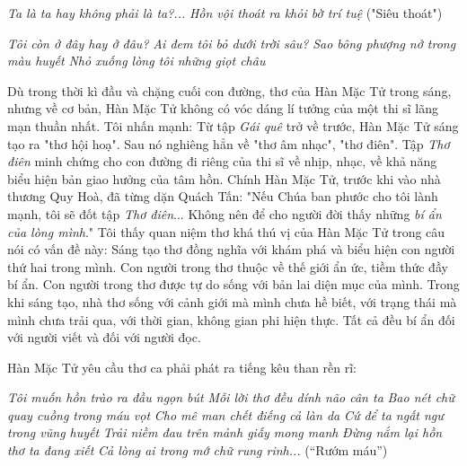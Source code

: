 \documentclass[../main.tex]{subfiles}
\begin{document}
\begin{multicols}{2}
\textit{Ta là ta hay không phải là ta?...} 
\textit{Hồn vội thoát ra khỏi bờ trí tuệ} 
("Siêu thoát") 
				 
\textit{Tôi còn ở đây hay ở đâu?} 
\textit{Ai đem tôi bỏ dưới trời sâu?} 
\textit{Sao bông phượng nở trong màu huyết} 
\textit{Nhỏ xuống lòng tôi những giọt châu} 
 
Dù trong thời kì đầu và chặng cuối con đường, thơ của Hàn Mặc Tử trong sáng, nhưng về cơ bản, Hàn Mặc Tử không có vóc dáng lí tưởng của một thi sĩ  lãng mạn thuần nhất. Tôi nhấn mạnh: Từ tập \textit{Gái quê} trở về trước, Hàn Mặc Tử sáng tạo ra "thơ hội hoạ". Sau nó nghiêng hẳn về "thơ âm nhạc",  "thơ điên". Tập \textit{Thơ điên} minh chứng cho con đường đi riêng của thi sĩ về nhịp, nhạc, về khả năng biểu hiện bản giao hưởng của tâm hồn. Chính Hàn Mặc Tử, trước khi vào nhà thương Quy Hoà, đã từng dặn Quách Tấn: "Nếu Chúa ban phước cho tôi lành mạnh, tôi sẽ đốt tập \textit{Thơ điên}... Không nên để cho người đời thấy những \textit{bí ẩn của lòng mình}." Tôi thấy quan niệm thơ khá thú vị của Hàn Mặc Tử trong câu nói có vấn đề này: Sáng tạo thơ đồng nghĩa với khám phá và biểu hiện con người thứ hai trong mình. Con người trong thơ thuộc về thế giới ẩn ức, tiềm thức đầy bí ẩn. Con người trong thơ được tự do sống với bản lai diện mục của mình. Trong khi sáng tạo, nhà thơ sống với cảnh giới mà mình chưa hề biết, với trạng thái mà mình chưa trải qua, với thời gian, không gian phi hiện thực. Tất cả đều bí ẩn đối với người viết và đối với người đọc. 
 
Hàn Mặc Tử yêu cầu thơ ca phải phát ra tiếng kêu than rền rĩ: 
 
\textit{Tôi muốn hồn trào ra đầu ngọn bút } 
\textit{Mỗi lời thơ đều dính não cân ta} 
\textit{Bao nét chữ quay cuồng trong máu vọt} 
\textit{Cho mê man chết điếng cả làn da } 
\textit{Cứ để ta ngất ngư trong vũng huyết } 
\textit{Trải niềm đau trên mảnh giấy mong manh} 
\textit{Đừng nắm lại hồn thơ ta đang xiết } 
\textit{Cả lòng ai trong mớ chữ rung rinh...} 
(“Rướm máu”) 
              

\end{multicols}
\end{document}
